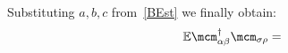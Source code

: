 \documentclass[12pt, notitlepage]{report}
\begin{document}
Substituting $a,b,c$ from~\eqref{BEst} we finally obtain:
\begin{equation*}
\mathbb{E}\mcm^\dagger_{\alpha\beta}\mcm_{\sigma\rho} = 

\end{equation*}
\end{document}
